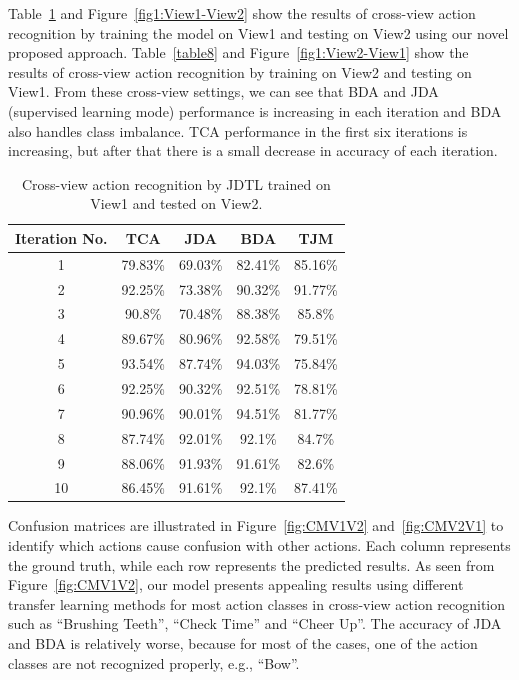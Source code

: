 Table~\ref{table5} and Figure~\ref{fig1:View1-View2} show the results of cross-view action recognition by training the model on View1 and testing on View2 using our novel proposed approach. Table~\ref{table8} and Figure~\ref{fig1:View2-View1} show the results of cross-view action recognition by training on View2 and testing on View1. From these cross-view settings, we can see that BDA and JDA (supervised learning mode) performance is increasing in each iteration and BDA also handles class imbalance. TCA performance in the first six iterations is increasing, but after that there is a small decrease in accuracy of each iteration.%

\begin{table}[hbt!]
	\centering
	\caption{Cross-view action recognition by JDTL trained on View1 and tested on View2.} 
	\begin{tabular}{@{\extracolsep{12pt}}ccccc}
		\toprule 
		Iteration No. &  TCA & JDA & BDA & TJM\\ 
		\hline
		\midrule
		1 &79.83\%	& 69.03\% &	82.41\%	 &85.16\%\\
		2&	92.25\%	&	73.38\%	&	90.32\%	&	91.77\%\\
		3&	90.8\%	&	70.48\%	&	88.38\%	&	85.8\%\\
		4&	89.67\%	&	80.96\%	&	92.58\%	&	79.51\%\\
		5&	93.54\%	&	87.74\%	&	94.03\%	&	75.84\%\\
		6&	92.25\%	&	90.32\%	&	92.51\%	&	78.81\%\\
		7&	90.96\%	&	90.01\%	&	94.51\%	&	81.77\%\\
		8&	87.74\%	&	92.01\%	&	92.1\%	&	84.7\%\\
		9&	88.06\%	&	91.93\%	&	91.61\%	&	82.6\%\\
		10&	86.45\%	&	91.61\%	&	92.1\%	&	87.41\%\\
		\bottomrule
		\hline
		\midrule
	\end{tabular}%
	\label{table5}
\end{table}
Confusion matrices are illustrated in Figure~\ref{fig:CMV1V2} and~\ref{fig:CMV2V1} to identify which actions cause confusion with other actions.
Each column represents the ground truth, while each row represents the predicted results.
As seen from Figure~\ref{fig:CMV1V2}, our model presents appealing results using different transfer learning methods for most action classes in cross-view action recognition such as \enquote{Brushing Teeth}, \enquote{Check Time} and \enquote{Cheer Up}. The accuracy of JDA and BDA is relatively worse, because for most of the cases, one of the action classes are not recognized properly, e.g., \enquote{Bow}.
